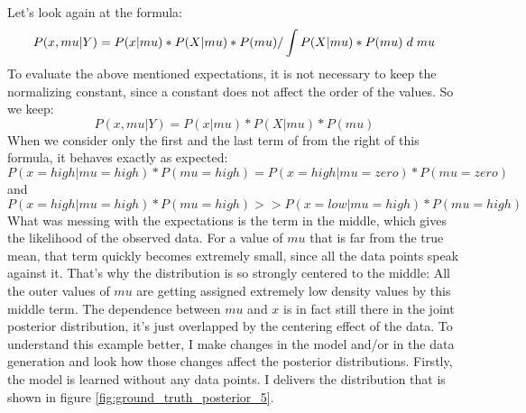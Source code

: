 \documentclass{article}
\begin{document}
Let's look again at the formula:
\begin{equation}
P(x,mu|Y) = P(x|mu) * P(X|mu) * P(mu) / \int P(X|mu) * P(mu) \hspace{1mm} d \hspace{1mm} mu
\end{equation}
To evaluate the above mentioned expectations, it is not necessary to keep the normalizing constant, since a constant does not affect the order of the values. So we keep:
\begin{equation}
P(x,mu|Y) = P(x|mu) * P(X|mu) * P(mu)
\end{equation}
When we consider only the first and the last term of from the right of this formula, it behaves exactly as expected: \begin{equation}
P(x=high|mu=high)*P(mu=high) = P(x=high|mu=zero)*P(mu=zero)
\end{equation}
and 
\begin{equation}
P(x=high|mu=high)*P(mu=high) >> P(x=low|mu=high)*P(mu=high)
\end{equation} What was messing with the expectations is the term in the middle, which gives the likelihood of the observed data. For a value of $mu$ that is far from the true mean, that term quickly becomes extremely small, since all the data points speak against it. That's why the distribution is so strongly centered to the middle: All the outer values of $mu$ are getting assigned extremely low density values by this middle term. 
The dependence between $mu$ and $x$ is in fact still there in the joint posterior distribution, it's just overlapped by the centering effect of the data. To understand this example better, I make changes in the model and/or in the data generation and look how those changes affect the posterior distributions. Firstly, the model is learned without any data points. I delivers the distribution that is shown in figure \ref{fig:ground_truth_posterior_5}.
\end{document}
